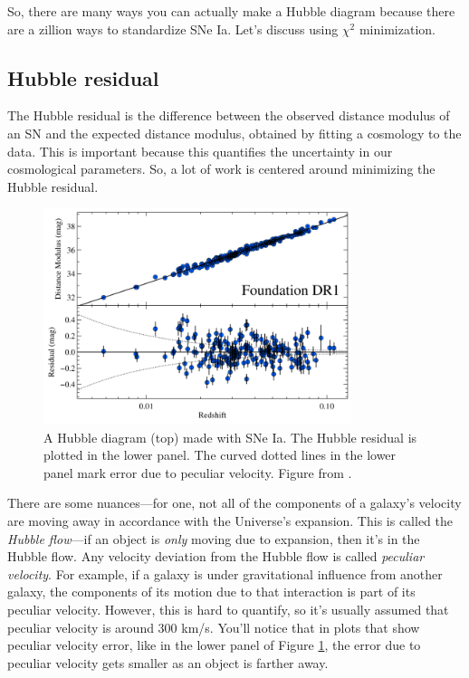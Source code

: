 So, there are many ways you can actually make a Hubble diagram because there are a zillion ways to standardize SNe Ia. Let's discuss using $\chi^{2}$ minimization. 

\subsection{Hubble residual}
The Hubble residual is the difference between the observed distance modulus of an SN and the expected distance modulus, obtained by fitting a cosmology to the data. This is important because this quantifies the uncertainty in our cosmological parameters. So, a lot of work is centered around minimizing the Hubble residual. 

\begin{figure}[h!]
    \centering
    \includegraphics[width=0.8\textwidth]{figs/hubble-resid.png}
    \caption{A Hubble diagram (top) made with SNe Ia. The Hubble residual is plotted in the lower panel. The curved dotted lines in the lower panel mark error due to peculiar velocity. Figure from \cite{Foley2017}.}
    \label{fig:hresid}
\end{figure}

There are some nuances---for one, not all of the components of a galaxy's velocity are moving away in accordance with the Universe's expansion. This is called the \textit{Hubble flow}---if an object is \textit{only} moving due to expansion, then it's in the Hubble flow. Any velocity deviation from the Hubble flow is called \textit{peculiar velocity}. For example, if a galaxy is under gravitational influence from another galaxy, the components of its motion due to that interaction is part of its peculiar velocity. However, this is hard to quantify, so it's usually assumed that peculiar velocity is around 300 km/s. You'll notice that in plots that show peculiar velocity error, like in the lower panel of Figure \ref{fig:hresid}, the error due to peculiar velocity gets smaller as an object is farther away. 

